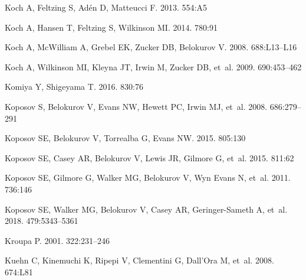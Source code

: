 \documentclass[a4paper]{ar-1col}
\begin{document}
\begin{thebibliography}{}
{Koch} A, {Feltzing} S, {Ad{\'e}n} D, {Matteucci} F. 2013.
\textit{\aap} 554:A5

{Koch} A, {Hansen} T, {Feltzing} S, {Wilkinson} MI. 2014.
\textit{\apj} 780:91

{Koch} A, {McWilliam} A, {Grebel} EK, {Zucker} DB, {Belokurov} V. 2008.
\textit{\apjl} 688:L13--L16

{Koch} A, {Wilkinson} MI, {Kleyna} JT, {Irwin} M, {Zucker} DB, et~al. 2009.
\textit{\apj} 690:453--462

{Komiya} Y, {Shigeyama} T. 2016.
\textit{\apj} 830:76

{Koposov} S, {Belokurov} V, {Evans} NW, {Hewett} PC, {Irwin} MJ, et~al. 2008.
\textit{\apj} 686:279--291

{Koposov} SE, {Belokurov} V, {Torrealba} G, {Evans} NW. 2015{}.
\textit{\apj} 805:130

{Koposov} SE, {Casey} AR, {Belokurov} V, {Lewis} JR, {Gilmore} G, et~al.
  2015{}.
\textit{\apj} 811:62

{Koposov} SE, {Gilmore} G, {Walker} MG, {Belokurov} V, {Wyn Evans} N, et~al.
  2011.
\textit{\apj} 736:146

{Koposov} SE, {Walker} MG, {Belokurov} V, {Casey} AR, {Geringer-Sameth} A,
  et~al. 2018.
\textit{\mnras} 479:5343--5361

{Kroupa} P. 2001.
\textit{\mnras} 322:231--246

{Kuehn} C, {Kinemuchi} K, {Ripepi} V, {Clementini} G, {Dall'Ora} M, et~al.
  2008.
\textit{\apjl} 674:L81


\end{thebibliography}
\end{document}
